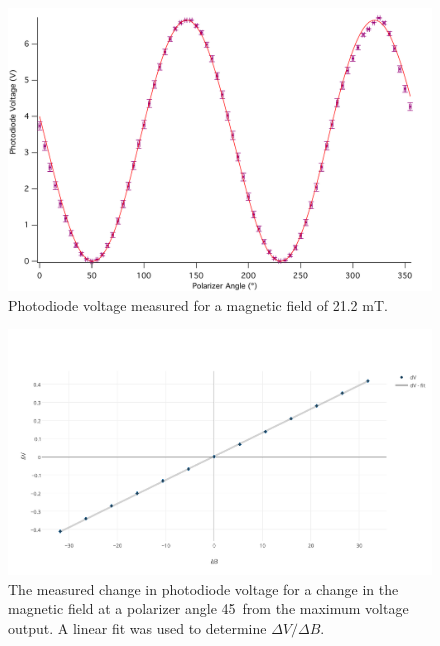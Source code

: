 \documentclass[prb,preprint]{revtex4-1}
\begin{document}
{{{{{{\begin{figure}
\includegraphics[width = 6.3in]{2A.pdf}
\caption{\label{maxfield}Photodiode voltage measured for a magnetic field of 21.2 mT.}
\end{figure}

\begin{figure}[t]
\includegraphics[width =6.3in]{verdetpic2.pdf}
\caption{\label{method1pic} The measured change in photodiode voltage for a change in the magnetic field at a polarizer angle 45\degree\  from the maximum voltage output. A linear fit was used to determine $\Delta V/\Delta B$.}
\end{figure}

}}}}}}
\end{document}
